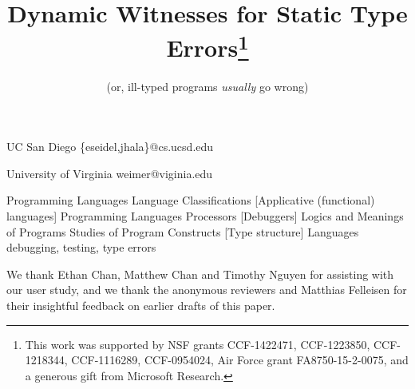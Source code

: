 \documentclass[9pt,numbers]{sigplanconf}
\theoremstyle{plain}%
\theoremstyle{definition}
\newcommand{\isTechReport}{false} %
\newcommand\includeTechReport[1]{%
  \ifthenelse{\equal{\isTechReport}{true}}
    {{#1}}
    {\ignorespaces}
\xspace}
\begin{document}
\toappear{}

\title{Dynamic Witnesses for Static Type Errors\thanks{This work was supported by NSF grants CCF-1422471, CCF-1223850,
CCF-1218344, CCF-1116289, CCF-0954024, Air Force grant FA8750-15-2-0075,
and a generous gift from Microsoft Research.}}

\subtitle{(or, ill-typed programs \emph{usually} go wrong)}

           {UC San Diego}
           {\{eseidel,jhala\}@cs.ucsd.edu}

           {University of Virginia}
           {weimer@viginia.edu}

\maketitle





         {Programming Languages}
         {Language Classifications}
         [Applicative (functional) languages]
         {Programming Languages}
         {Processors}
         [Debuggers]
         {Logics and Meanings of Programs}
         {Studies of Program Constructs}
         [Type structure]
\terms
Languages
\keywords
debugging, testing, type errors






% 
% 

% 

\acks

We thank Ethan Chan, Matthew Chan and Timothy Nguyen for assisting
with our user study, and we thank the anonymous reviewers and
Matthias Felleisen for their insightful feedback on earlier drafts
of this paper.
%

{


\balance
}

\includeTechReport
{

\clearpage
\appendix

%
}
\end{document}
